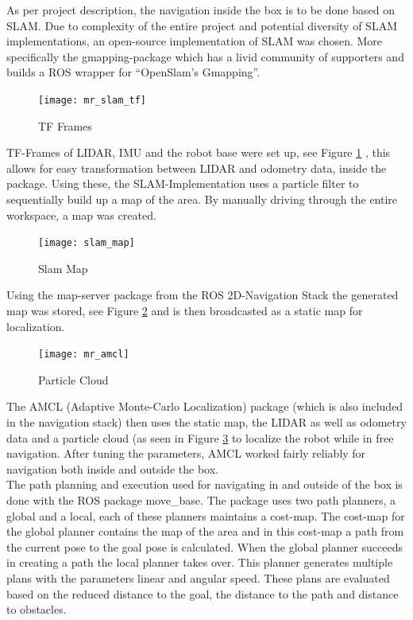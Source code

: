     As per project description, the navigation inside the box is to be done based on SLAM. 
    Due to complexity of the entire project and potential diversity of SLAM implementations, an open-source implementation of SLAM was chosen. 
    More specifically the gmapping-package \cite{gmapping} which has a livid community of supporters and builds a ROS wrapper for “OpenSlam's Gmapping”\cite{openslam}. 
	\begin{figure}[H]
        \centering
        \texttt{[image: mr\_slam\_tf]}
        \caption{TF Frames}
        \label{fig:tf_frames}
    \end{figure}
    TF-Frames of LIDAR, IMU and the robot base were set up, see Figure \ref{fig:tf_frames} , this allows for easy transformation between LIDAR and odometry data, inside the package. 
    Using these, the SLAM-Implementation uses a particle filter to sequentially build up a map of the area. 
    By manually driving through the entire workspace, a map was created. 
    \begin{figure}[H]
        \centering
        \texttt{[image: slam\_map]}
        \caption{Slam Map}
        \label{fig:slam_map}
    \end{figure}
    Using the map-server package from the ROS 2D-Navigation Stack \cite{navigation_stack} the generated map was stored, see Figure \ref{fig:slam_map} and is then broadcasted as a static map for localization.
   \begin{figure}[H]
        \centering
        \texttt{[image: mr\_amcl]}
        \caption{Particle Cloud}
        \label{fig:particle_cloud}
    \end{figure}
    The AMCL (Adaptive Monte-Carlo Localization) package (which is also included in the navigation stack) then uses the static map, the LIDAR as well as odometry data and a particle cloud (as seen in Figure \ref{fig:particle_cloud} to localize the robot while in free navigation. 
    After tuning the parameters, AMCL worked fairly reliably for navigation both inside and outside the box.\\
	The path planning and execution used for navigating in and outside of the box is done with the ROS package move{\_}base. The package uses two path planners, a global and a local, each of these planners maintains a cost-map. The cost-map for the global planner contains the map of the area and in this cost-map a path from the current pose to the goal pose is calculated. When the global planner succeeds in creating a path the local planner takes over. This planner generates multiple plans with the parameters linear and angular speed. These plans are evaluated based on the reduced distance to the goal, the distance to the path and distance to obstacles. \\
